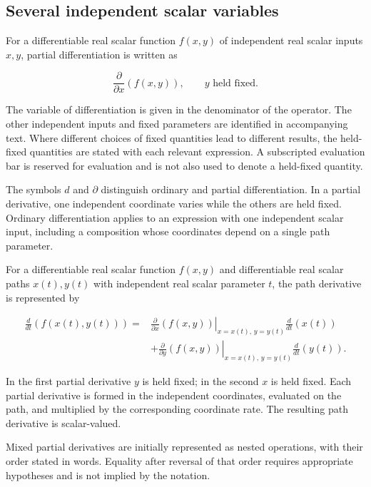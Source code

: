 \documentclass[11pt,oneside,openany]{book}
\begin{document}
\subsection{Several independent scalar variables}

For a differentiable real scalar function \(f(x,y)\) of independent real
scalar inputs \(x,y\), partial differentiation is written as

\[
\frac{\partial}{\partial x}\left(f(x,y)\right),
\qquad y\text{ held fixed}.
\]

The variable of differentiation is given in the denominator of the
operator. The other independent inputs and fixed parameters are identified
in accompanying text. Where different choices of fixed quantities lead to
different results, the held-fixed quantities are stated with each relevant
expression. A subscripted evaluation bar is reserved for evaluation and is
not also used to denote a held-fixed quantity.

The symbols \(d\) and \(\partial\) distinguish ordinary and partial
differentiation. In a partial derivative, one independent coordinate varies
while the others are held fixed. Ordinary differentiation applies to an
expression with one independent scalar input, including a composition
whose coordinates depend on a single path parameter.

For a differentiable real scalar function \(f(x,y)\) and differentiable real
scalar paths \(x(t),y(t)\) with independent real scalar parameter \(t\), the
path derivative is represented by

\[
\begin{aligned}
\frac{d}{dt}\left(f(x(t),y(t))\right)
={}&\left.\frac{\partial}{\partial x}\left(f(x,y)\right)
\right|_{x=x(t),\,y=y(t)}
\frac{d}{dt}\left(x(t)\right)\\
&+\left.\frac{\partial}{\partial y}\left(f(x,y)\right)
\right|_{x=x(t),\,y=y(t)}
\frac{d}{dt}\left(y(t)\right).
\end{aligned}
\]

In the first partial derivative \(y\) is held fixed; in the second \(x\) is
held fixed. Each partial derivative is formed in the independent
coordinates, evaluated on the path, and multiplied by the corresponding
coordinate rate. The resulting path derivative is scalar-valued.

Mixed partial derivatives are initially represented as nested operations,
with their order stated in words. Equality after reversal of that order
requires appropriate hypotheses and is not implied by the notation.
\clearpage
\end{document}
